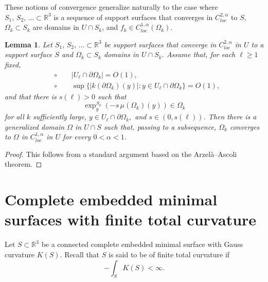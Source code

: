 \documentclass[11pt]{amsart}
\newtheorem{lem}[prop]{Lemma}
\begin{document}
\begin{appendices}
These notions of convergence generalize naturally to the case where $S_1,\,S_2,\,\ldots\subset \mathbb{R}^3$ is a sequence of support surfaces that converges in $C^{2,\alpha}_{loc}$ to $S$,  $\Omega_k\subset S_k$ are domains in $U\cap S_k$, and $f_k\in C_{loc}^{1,\alpha}(\Omega_k)$.


\begin{lem} \label{compactness} 
	Let $S_1,\,S_2,\,\ldots\subset \mathbb{R}^3$ be support surfaces that converge in $C^{2,\alpha}_{loc}$ in $U$ to a support surface $S$ and $\Omega_k\subset S_k$ domains in $U\cap S_k$. Assume that, for each $\ell\geq 1$ fixed,
	\begin{align*}
		&\circ \qquad |U_\ell\cap\partial \Omega_k|=O(1),
		\\&\circ \qquad 	\sup\{|k( \partial \Omega_k)(y)|:y\in U_\ell\cap \partial \Omega_k\}=O(1),
	\end{align*}
	and that there is 	 $s(\ell)>0$ such that $$\exp^{S_k}_y(-s\,\mu( \Omega_k)(y))\in  \Omega_k$$ for  all $k$ sufficiently large,   $y\in U_{\ell}\cap \partial \Omega_k,$ and $s\in (0,s(\ell))$. Then there is a generalized domain $\Omega$ in $U\cap S$ such that, passing to a subsequence, $\Omega_k$ converges to $\Omega$ in $C^{1,\alpha}_{loc}$ in $U$ for every $0<\alpha<1$. 
\end{lem}
\begin{proof}
	This follows from a standard argument based on the Arzelà–Ascoli theorem.
\end{proof}


\section{Complete embedded minimal surfaces with finite total curvature}
\label{appendix: cemswft}

Let $S\subset \mathbb{R}^3$ be a connected complete embedded minimal surface with Gauss curvature $K(S)$. Recall that $S$ is said to be of finite total curvature if 
$$
-\int_S K(S)<\infty.
$$


\end{appendices}
\end{document}
